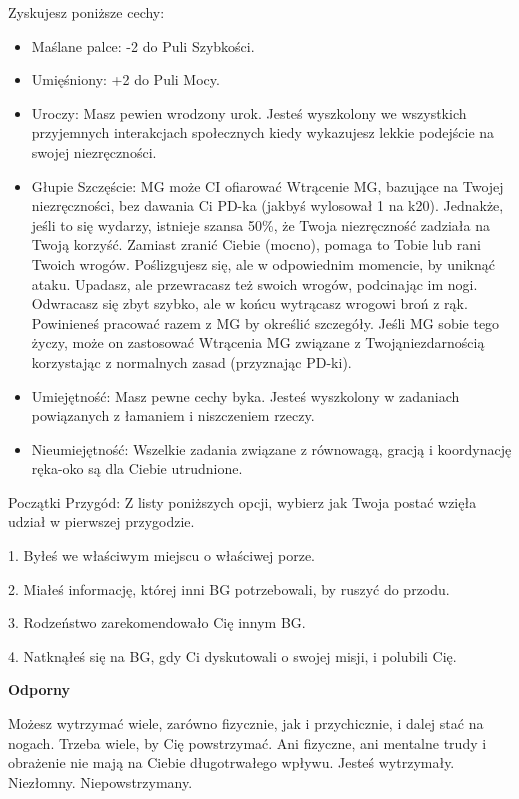 Zyskujesz poniższe cechy:
\begin{itemize}
\item Maślane palce: -2 do Puli Szybkości.
\item  Umięśniony: +2 do Puli Mocy.
\item Uroczy: Masz pewien wrodzony urok. Jesteś wyszkolony we wszystkich przyjemnych interakcjach społecznych kiedy wykazujesz lekkie podejście na swojej niezręczności.
\item  Głupie Szczęście: MG może CI ofiarować Wtrącenie MG, bazujące na Twojej niezręczności, bez dawania Ci PD-ka (jakbyś wylosował 1 na k20). Jednakże, jeśli to się wydarzy, istnieje szansa 50\%, że Twoja niezręczność zadziała na Twoją korzyść. Zamiast zranić Ciebie (mocno), pomaga to Tobie lub rani Twoich wrogów. Poślizgujesz się, ale w odpowiednim momencie, by uniknąć ataku. Upadasz, ale przewracasz też swoich wrogów, podcinając im nogi. Odwracasz się zbyt szybko, ale w końcu wytrącasz wrogowi broń z rąk. Powinieneś pracować razem z MG by określić szczegóły. Jeśli MG sobie tego życzy, może on zastosować Wtrącenia MG związane z Twojąniezdarnością korzystając z normalnych zasad (przyznając PD-ki).
\item Umiejętność: Masz pewne cechy byka. Jesteś wyszkolony w zadaniach powiązanych z łamaniem i niszczeniem rzeczy.
\item Nieumiejętność: Wszelkie zadania związane z równowagą, gracją i koordynację ręka-oko są dla Ciebie utrudnione. 
\end{itemize}

Początki Przygód: Z listy poniższych opcji, wybierz jak Twoja postać wzięła udział w pierwszej przygodzie.

1. Byłeś we właściwym miejscu o właściwej porze.

2. Miałeś informację, której inni BG potrzebowali, by ruszyć do przodu.

3. Rodzeństwo zarekomendowało Cię innym BG.

4. Natknąłeś się na BG, gdy Ci dyskutowali o swojej misji, i polubili Cię.

\textbf{Odporny}

Możesz wytrzymać wiele, zarówno fizycznie, jak i przychicznie, i dalej stać na nogach. Trzeba wiele, by Cię powstrzymać. Ani fizyczne, ani mentalne trudy i obrażenie nie mają na Ciebie długotrwałego wpływu. Jesteś wytrzymały. Niezłomny. Niepowstrzymany. 


